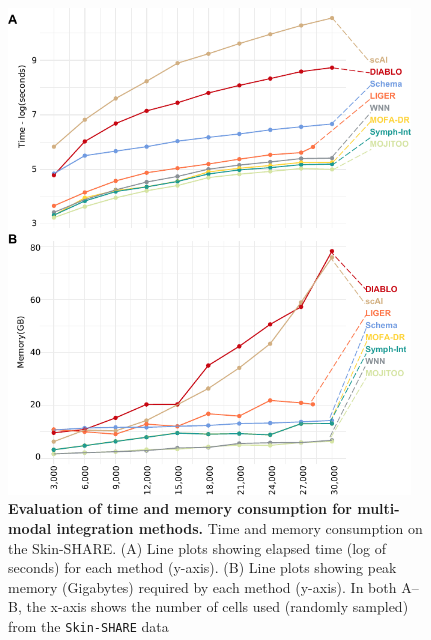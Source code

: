 \begin{figure}[!ht]
	\centering
	\includegraphics[width=0.95\textwidth]{time_memory/fig}
	\vspace{0.1cm}
	\caption[Evaluation of time and memory consumption for multi-modal integration methods.]{\textbf{Evaluation of time and memory consumption for multi-modal integration methods.} Time and memory consumption on the Skin-SHARE. (A) Line plots showing elapsed time (log of seconds) for each method (y-axis). (B) Line plots showing peak memory (Gigabytes) required by each method (y-axis). In both A–B, the x-axis shows the number of cells used (randomly sampled) from the \texttt{Skin-SHARE} data}
	\label{fig:time_memory}
\end{figure}

